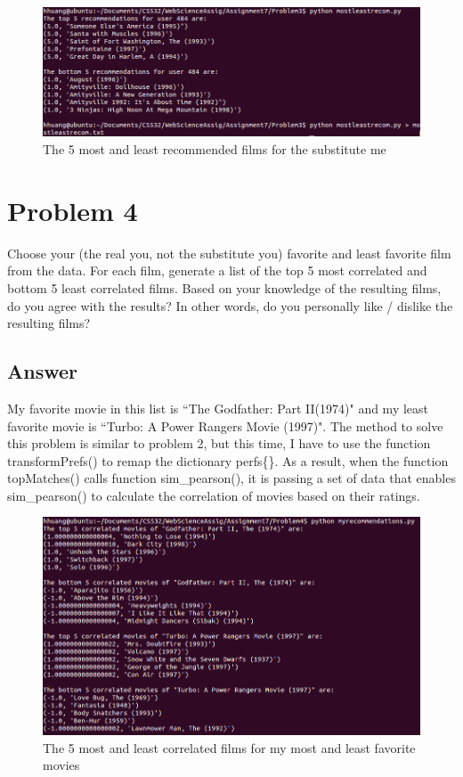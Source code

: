 \documentclass[12pt]{article}
\begin{document}
\begin{figure}[h]
\centering
\includegraphics[width=6.5in]{mostleastrecom.png}
\caption{The 5 most and least recommended films for the substitute me}
\end{figure}



\section*{Problem 4}

Choose your (the real you, not the substitute you) favorite and
least favorite film from the data.  For each film, generate a list
of the top 5 most correlated and bottom 5 least correlated films.
Based on your knowledge of the resulting films, do you agree with
the results?  In other words, do you personally like / dislike
the resulting films?

\subsection*{Answer}

My favorite movie in this list is ``The Godfather: Part II(1974)" and my least favorite movie is ``Turbo: A Power Rangers Movie (1997)". The method to solve this problem is similar to problem 2, but this time, I have to use the function transformPrefs() to remap the dictionary perfs\{\}. As a result, when the function topMatches() calls function sim\_pearson(), it is passing a set of data that enables sim\_pearson() to calculate the correlation of movies based on their ratings. 

\begin{figure}[h]
\centering
\includegraphics[width=6.5in]{myrecommendations.png}
\caption{The 5 most and least correlated films for my most and least favorite movies}
\end{figure}
\end{document}
